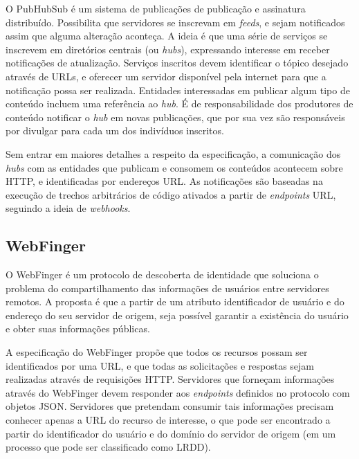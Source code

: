 O PubHubSub é um sistema de publicações de publicação e assinatura distribuído.
Possibilita que servidores se inscrevam em \textit{feeds}, e sejam notificados assim
que alguma alteração aconteça. A ideia é que uma série de serviços se inscrevem em
diretórios centrais (ou \textit{hubs}), expressando interesse em receber
notificações de atualização. Serviços inscritos devem identificar o tópico desejado
através de URLs, e oferecer um servidor disponível pela internet para que a
notificação possa ser realizada. Entidades interessadas em publicar algum tipo de
conteúdo incluem uma referência ao \textit{hub}. É de responsabilidade dos
produtores de conteúdo notificar o \textit{hub} em novas publicações, que por sua
vez são responsáveis por divulgar para cada um dos indivíduos inscritos.

Sem entrar em maiores detalhes a respeito da especificação, a comunicação dos
\textit{hubs} com as entidades que publicam e consomem os conteúdos acontecem sobre
HTTP, e identificadas por endereços URL. As notificações são baseadas na execução
de trechos arbitrários de código ativados a partir de \textit{endpoints} URL, 
seguindo a ideia de \textit{webhooks}.

\subsection{WebFinger}


O WebFinger é um protocolo de descoberta de identidade que soluciona o problema do
compartilhamento das informações de usuários entre servidores remotos. A proposta é
que a partir de um atributo identificador de usuário e do endereço do seu servidor
de origem, seja possível garantir a existência do usuário e obter suas informações
públicas.

A especificação do WebFinger propõe que todos os recursos possam ser identificados
por uma URL, e que todas as solicitações e respostas sejam realizadas através de
requisições HTTP. Servidores que forneçam informações através do WebFinger devem
responder aos \textit{endpoints} definidos no protocolo com objetos JSON. Servidores
que pretendam consumir tais informações precisam conhecer apenas a URL do recurso de
interesse, o que pode ser encontrado a partir do identificador do usuário e do
domínio do servidor de origem (em um processo que pode ser classificado como LRDD). 


